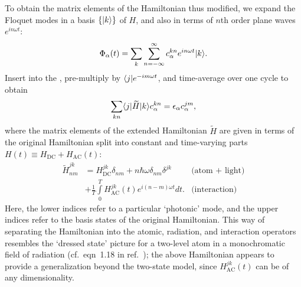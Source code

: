 To obtain the matrix elements of the Hamiltonian thus modified, we expand the
Floquet modes in a basis $\{|k\rangle\}$ of $H$, and also in terms of $n$th order
plane waves $e^{in\omega t}$:
%
\[
\Phi_\alpha(t)=\sum\limits_k\sum\limits_{n=-\infty}^\infty c_\alpha^{kn}e^{in\omega t}|k\rangle.
\]
%
Insert into the \TISE, pre-multiply by $\langle j|e^{-im\omega t}$, and
time-average over one cycle to obtain
%
\[
\sum\limits_{kn}\langle j|\widetilde{H}|k\rangle c_\alpha^{kn}=\epsilon_\alpha c_\alpha^{jm},
\]
%
where the matrix elements of the extended Hamiltonian $\widetilde{H}$ are given
in terms of the original Hamiltonian split into constant and time-varying parts
$H(t)\equiv H_\text{DC}+H_\text{AC}(t)$:
%
\begin{align*}
    \label{floqMatElems}
    \widetilde{H}_{nm}^{jk}&=
    H_\text{DC}^{jk}\delta_{nm}
    +n\hbar\omega\delta_{nm}\delta^{jk}
    &\text{(atom + light)}\\
    &+\frac{1}{T}\int\limits_0^TH_\text{AC}^{jk}(t)e^{i(n-m)\omega t}dt.
    &\text{(interaction)}
\end{align*}
%
Here, the lower indices refer to a particular `photonic' mode, and the upper
indices refer to the basis states of the original Hamiltonian. This way of
separating the Hamiltonian into the atomic, radiation, and interaction operators
resembles the `dressed state' picture for a two-level atom in a monochromatic
field of radiation (cf.\ eqn~1.18 in ref.~\cite{metcalf2002laser}); the above
Hamiltonian appears to provide a generalization beyond the two-state model,
since $H_\text{AC}^{jk}(t)$ can be of any dimensionality.

